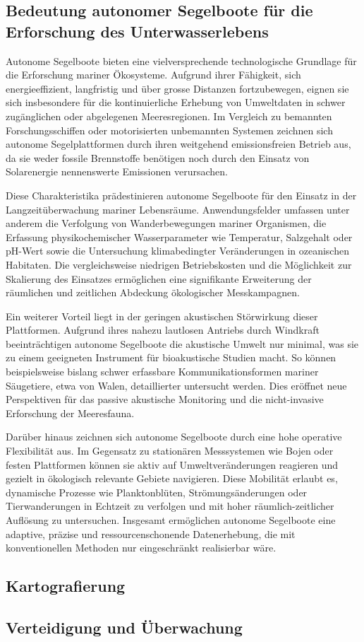 \subsection{Bedeutung autonomer Segelboote für die Erforschung des Unterwasserlebens}

Autonome Segelboote bieten eine vielversprechende technologische Grundlage für die Erforschung mariner Ökosysteme. Aufgrund ihrer Fähigkeit, sich energieeffizient, langfristig und über grosse Distanzen fortzubewegen, eignen sie sich insbesondere für die kontinuierliche Erhebung von Umweltdaten in schwer zugänglichen oder abgelegenen Meeresregionen. Im Vergleich zu bemannten Forschungsschiffen oder motorisierten unbemannten Systemen zeichnen sich autonome Segelplattformen durch ihren weitgehend emissionsfreien Betrieb aus, da sie weder fossile Brennstoffe benötigen noch durch den Einsatz von Solarenergie nennenswerte Emissionen verursachen.

Diese Charakteristika prädestinieren autonome Segelboote für den Einsatz in der Langzeitüberwachung mariner Lebensräume. Anwendungsfelder umfassen unter anderem die Verfolgung von Wanderbewegungen mariner Organismen, die Erfassung physikochemischer Wasserparameter wie Temperatur, Salzgehalt oder pH-Wert sowie die Untersuchung klimabedingter Veränderungen in ozeanischen Habitaten. Die vergleichsweise niedrigen Betriebskosten und die Möglichkeit zur Skalierung des Einsatzes ermöglichen eine signifikante Erweiterung der räumlichen und zeitlichen Abdeckung ökologischer Messkampagnen.

Ein weiterer Vorteil liegt in der geringen akustischen Störwirkung dieser Plattformen. Aufgrund ihres nahezu lautlosen Antriebs durch Windkraft beeinträchtigen autonome Segelboote die akustische Umwelt nur minimal, was sie zu einem geeigneten Instrument für bioakustische Studien macht. So können beispielsweise bislang schwer erfassbare Kommunikationsformen mariner Säugetiere, etwa von Walen, detaillierter untersucht werden. Dies eröffnet neue Perspektiven für das passive akustische Monitoring und die nicht-invasive Erforschung der Meeresfauna.

Darüber hinaus zeichnen sich autonome Segelboote durch eine hohe operative Flexibilität aus. Im Gegensatz zu stationären Messsystemen wie Bojen oder festen Plattformen können sie aktiv auf Umweltveränderungen reagieren und gezielt in ökologisch relevante Gebiete navigieren. Diese Mobilität erlaubt es, dynamische Prozesse wie Planktonblüten, Strömungsänderungen oder Tierwanderungen in Echtzeit zu verfolgen und mit hoher räumlich-zeitlicher Auflösung zu untersuchen. Insgesamt ermöglichen autonome Segelboote eine adaptive, präzise und ressourcenschonende Datenerhebung, die mit konventionellen Methoden nur eingeschränkt realisierbar wäre.



\subsection{Kartografierung}




\subsection{Verteidigung und Überwachung}




